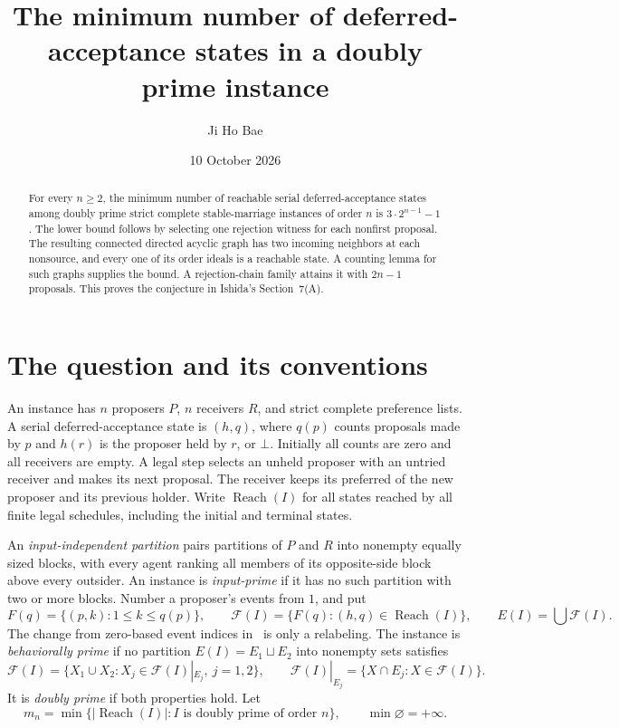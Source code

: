 \documentclass[11pt]{article}
\title{The minimum number of deferred-acceptance states in a doubly prime instance}
\author{Ji Ho Bae}
\date{10 October 2026}
\newcommand{\Reach}{\operatorname{Reach}}
\begin{document}
\maketitle
\begin{abstract}
For every $n\ge2$, the minimum number of reachable serial
deferred-acceptance states among doubly prime strict complete
stable-marriage instances of order $n$ is $3\cdot2^{n-1}-1$.
The lower bound follows by selecting one rejection witness for each
nonfirst proposal. The resulting connected directed acyclic graph has
two incoming neighbors at each nonsource, and every one of its order
ideals is a reachable state. A counting lemma for such graphs supplies
the bound. A rejection-chain family attains it with $2n-1$ proposals.
This proves the conjecture in Ishida's Section~7(A).
\end{abstract}

\section{The question and its conventions}

An instance has $n$ proposers $P$, $n$ receivers $R$, and strict complete
preference lists. A serial deferred-acceptance state is $(h,q)$, where
$q(p)$ counts proposals made by $p$ and $h(r)$ is the proposer held by
$r$, or $\bot$. Initially all counts are zero and all receivers are empty.
A legal step selects an unheld proposer with an untried receiver and
makes its next proposal. The receiver keeps its preferred of the new
proposer and its previous holder. Write $\Reach(I)$ for all states
reached by all finite legal schedules, including the initial and terminal
states.

An \emph{input-independent partition} pairs partitions of $P$ and $R$
into nonempty equally sized blocks, with every agent ranking all members
of its opposite-side block above every outsider. An instance is
\emph{input-prime} if it has no such partition with two or more blocks.
Number a proposer's events from $1$, and put
\[
 F(q)=\{(p,k):1\le k\le q(p)\},\qquad
 \mathcal F(I)=\{F(q):(h,q)\in\Reach(I)\},\qquad
 E(I)=\bigcup\mathcal F(I).
\]
The change from zero-based event indices in~\cite{ishida} is only a
relabeling. The instance is \emph{behaviorally prime} if no partition
$E(I)=E_1\sqcup E_2$ into nonempty sets satisfies
\[
 \mathcal F(I)=\{X_1\cup X_2:X_j\in\mathcal F(I)|_{E_j},\ j=1,2\},
 \qquad
 \mathcal F(I)|_{E_j}=\{X\cap E_j:X\in\mathcal F(I)\}.
\]
It is \emph{doubly prime} if both properties hold. Let
\[
 m_n=\min\{|\Reach(I)|: I\text{ is doubly prime of order }n\},
 \qquad \min\varnothing=+\infty.
\]
\end{document}
